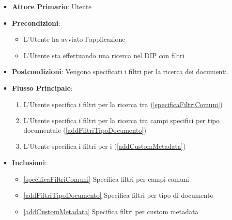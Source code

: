 \begin{itemize}
      \item \textbf{Attore Primario}: Utente
      \item \textbf{Precondizioni}: 
      \begin{itemize}
            \item L'Utente ha avviato l'applicazione
            \item L'Utente sta effettuando una ricerca nel DIP con filtri
      \end{itemize}
      \item \textbf{Postcondizioni}: Vengono specificati i filtri per la ricerca dei documenti.
      \item \textbf{Flusso Principale}:
      \begin{enumerate}
            \item L'Utente specifica i filtri per la ricerca tra  (\ref{specificaFiltriComuni})
            \item L'Utente specifica i filtri per la ricerca tra campi specifici per tipo documentale (\ref{addFiltriTipoDocumento})
            \item L'Utente specifica i filtri per i  (\ref{addCustomMetadata})
      \end{enumerate}
      \item \textbf{Inclusioni}: 
      \begin{itemize}
            \item \ref{specificaFiltriComuni} Specifica filtri per campi comuni
            \item \ref{addFiltriTipoDocumento} Specifica filtri per tipo di documento
            \item \ref{addCustomMetadata} Specifica filtri per custom metadata
      \end{itemize}
\end{itemize}


